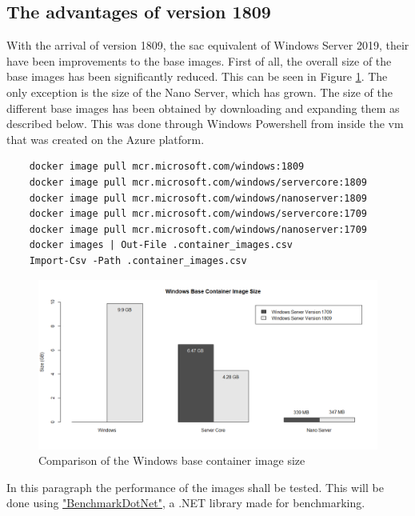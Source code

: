 \subsection{The advantages of version 1809}
With the arrival of version 1809, the \acrfull{sac} equivalent of Windows Server 2019, their have been improvements to the base images. First of all, the overall size of the base images has been significantly reduced. This can be seen in Figure \ref{fig:container_size}. The only exception is the size of the Nano Server, which has grown.
The size of the different base images has been obtained by downloading and expanding them as described below. This was done through Windows Powershell from inside the \acrshort{vm} that was created on the Azure platform. 

\begin{verbatim}
	docker image pull mcr.microsoft.com/windows:1809
	docker image pull mcr.microsoft.com/windows/servercore:1809
	docker image pull mcr.microsoft.com/windows/nanoserver:1809  
	docker image pull mcr.microsoft.com/windows/servercore:1709 
	docker image pull mcr.microsoft.com/windows/nanoserver:1709   
	docker images | Out-File .container_images.csv
	Import-Csv -Path .container_images.csv
\end{verbatim}

\begin{figure}[h]
	\captionsetup{width=0.8\linewidth}
	\includegraphics[width=0.9\linewidth]{img/Container_size.png}
	\centering
	\caption{Comparison of the Windows base container image size}
	\label{fig:container_size}
\end{figure}


In this paragraph the performance of the images shall be tested. This will be done using \href{https://benchmarkdotnet.org/}{"BenchmarkDotNet"}, a .NET library made for benchmarking. \autocite{Akinshin2019}
 
